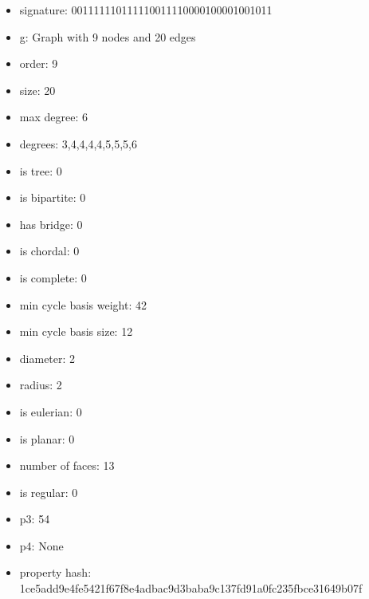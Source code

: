 \newpage
\begin{figure}
\end{figure}
\begin{itemize}
\item signature: 001111110111110011110000100001001011
\item g: Graph with 9 nodes and 20 edges
\item order: 9
\item size: 20
\item max degree: 6
\item degrees: 3,4,4,4,4,5,5,5,6
\item is tree: 0
\item is bipartite: 0
\item has bridge: 0
\item is chordal: 0
\item is complete: 0
\item min cycle basis weight: 42
\item min cycle basis size: 12
\item diameter: 2
\item radius: 2
\item is eulerian: 0
\item is planar: 0
\item number of faces: 13
\item is regular: 0
\item p3: 54
\item p4: None
\item property hash: 1ce5add9e4fe5421f67f8e4adbac9d3baba9c137fd91a0fc235fbce31649b07f
\end{itemize}
